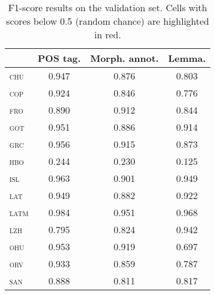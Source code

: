 \documentclass{../acl_latex.tex}
\begin{document}
\begin{table}[t]
\centering
\begin{tabular}{lccc}
\toprule
                 & POS tag. & Morph. annot. & Lemma. \\ \midrule
\textsc{chu}     &  0.947   &  0.876        & 0.803  \\ 
\textsc{cop}     &  0.924   &  0.846        & 0.776  \\ 
\textsc{fro}     &  0.890   &  0.912        & 0.844  \\
\textsc{got}     &  0.951   &  0.886        & 0.914  \\
\textsc{grc}     &  0.956   &  0.915        & 0.873  \\
\textsc{hbo}     &  \cellcolor{red!25}0.244   & \cellcolor{red!25}  0.230 & \cellcolor{red!25} 0.125  \\
\textsc{isl}     &  0.963   &  0.901        & 0.949  \\
\textsc{lat}     &  0.949   &  0.882        & 0.922  \\
\textsc{latm}    &  0.984   &  0.951        & 0.968  \\
\textsc{lzh}     &  0.795   &  0.824        & 0.942  \\
\textsc{ohu}     &  0.953   &  0.919        & 0.697  \\
\textsc{orv}     &  0.933   &  0.859        & 0.787  \\
\textsc{san}     &  0.888   &  0.811        & 0.817  \\ \bottomrule 
\end{tabular}
\caption{
    F1-score results on the validation set.
    Cells with scores below 0.5 (random chance) are highlighted in \colorbox{red!25}{red}.
}
\label{table:validation_results}
\end{table}
\end{document}

